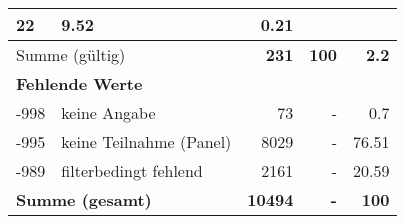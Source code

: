 \begin{longtable}{lXrrr}
       \num{22} &
       \num[round-mode=places,round-precision=2]{9,52} &
         \num[round-mode=places,round-precision=2]{0,21} \\
     \midrule
     \multicolumn{2}{l}{Summe (gültig)} &
       \textbf{\num{231}} &
     \textbf{100} &
       \textbf{\num[round-mode=places,round-precision=2]{2,2}} \\
     \multicolumn{5}{l}{\textbf{Fehlende Werte}}\\
       -998 &
       keine Angabe &
         \num{73} &
        - &
         \num[round-mode=places,round-precision=2]{0,7} \\
       -995 &
       keine Teilnahme (Panel) &
         \num{8029} &
        - &
         \num[round-mode=places,round-precision=2]{76,51} \\
       -989 &
       filterbedingt fehlend &
         \num{2161} &
        - &
         \num[round-mode=places,round-precision=2]{20,59} \\
     \midrule
     \multicolumn{2}{l}{\textbf{Summe (gesamt)}} &
          \textbf{\num{10494}} &
        \textbf{-} &
        \textbf{100} \\
     \bottomrule
     \end{longtable}
     
